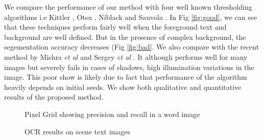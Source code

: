 We compare the performance of our method with four well known thresholding algorithms 
i.e Kittler \cite{A5}, Otsu \cite{A2}, Niblack \cite{A9} and Sauvola \cite{A6}.
In Fig \ref{fig:good}, we can see that these techniques perform fairly well when the 
foreground text and background are well defined. But in the presence of complex
background, the segementation accuracy decreases (Fig \ref{fig:bad}.
We also compare with the recent method by Mishra \emph{et al} \cite{A16} and Sergey \emph{et al} \cite{chap4-4}.
It although performs well for many images but severely
fails in cases of shadows, high illumination variations 
in the image. This poor show is likely due to fact that
performance of the algorithm heavily depends on initial seeds.
We show both qualitative and quantitative results of the proposed method. 
\begin{figure}[p]
\centering
{}
\label{fig:accuracy}
\caption
{Pixel Grid showing precision and recall in a word image}
\vspace{6mm}
\label{fig:ocr}
\caption
{OCR results on scene text images}
\end{figure}
